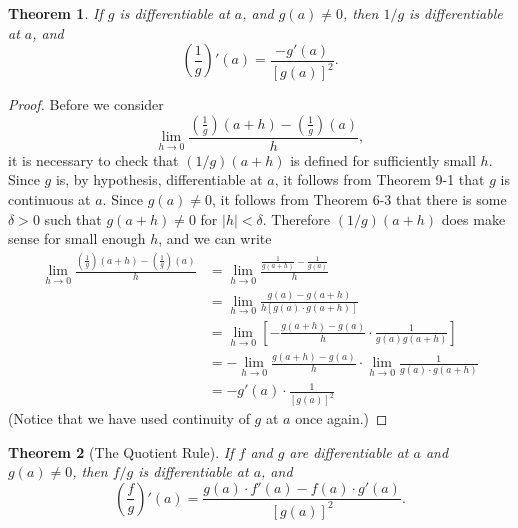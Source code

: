 \documentclass{article}
\numberwithin{corollary}{subsection}
\numberwithin{definition}{subsection}
\numberwithin{lemma}{subsection}
\newtheorem{theorem}{Theorem}
\numberwithin{theorem}{subsection}
\begin{document}
\begin{theorem}
  If $g$ is differentiable at $a$, and $g(a) \neq 0$, then $1/g$ is
  differentiable at $a$, and \[
    \left(\frac{1}{g}\right)'(a) = \frac{-g'(a)}{[g(a)]^2}.
  \]
\end{theorem}
\begin{proof}
  Before we consider \[
    \lim_{h \to 0} \frac{\left(\frac{1}{g}\right)(a + h) -
    \left(\frac{1}{g}\right)(a)}{h},
  \] it is necessary to check that $(1/g)(a + h)$ is defined for sufficiently
  small $h$. Since $g$ is, by hypothesis, differentiable at $a$, it follows
  from Theorem 9-1 that $g$ is continuous at $a$. Since $g(a) \neq 0$, it
  follows from Theorem 6-3 that there is some $\delta > 0$ such that $g(a + h)
  \neq 0$ for $|h| < \delta$. Therefore $(1/g)(a + h)$ does make sense for
  small enough $h$, and we can write
  \begin{align*}
    \lim_{h \to 0} \frac{\left( \frac{1}{g} \right)(a + h) - \left( \frac
    {1}{g} \right)(a)}{h}
    &= \lim_{h \to 0} \frac{\frac{1}{g(a + h)} - \frac{1}{g(a)}}{h} \\
    &= \lim_{h \to 0} \frac{g(a) - g(a + h)}{h[g(a) \cdot g(a + h)]} \\
    &= \lim_{h \to 0} \left[-\frac{g(a + h) - g(a)}{h} \cdot \frac{1}
    {g(a)g(a + h)}\right] \\
    &= -\lim_{h \to 0} \frac{g(a + h) - g(a)}{h} \cdot \lim_{h \to 0}
    \frac{1}{g(a) \cdot g(a + h)} \\
    &= -g'(a) \cdot \frac{1}{[g(a)]^2}
  \end{align*}
  (Notice that we have used continuity of $g$ at $a$ once again.)
\end{proof}

\begin{theorem}[The Quotient Rule]
  If $f$ and $g$ are differentiable at $a$ and $g(a) \neq 0$, then $f/g$ is
  differentiable at $a$, and \[
    \left( \frac{f}{g} \right)'(a)
    = \frac{g(a) \cdot f'(a) - f(a) \cdot g'(a)}{[g(a)]^2}.
  \]
\end{theorem}
\end{document}
